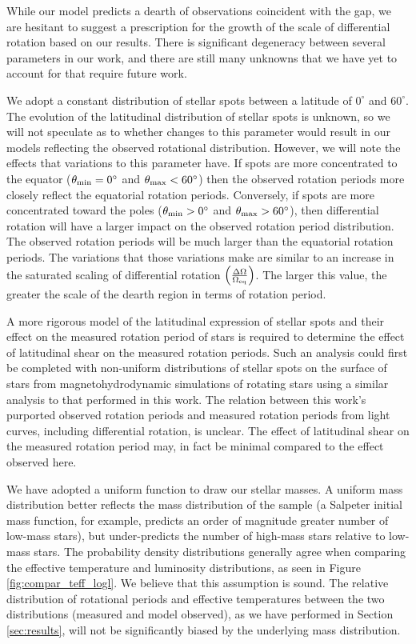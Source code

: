 While our model predicts a dearth of observations coincident with the gap, we are hesitant to suggest a prescription for the growth of the scale of differential rotation based on our results.
There is significant degeneracy between several parameters in our work, and there are still many unknowns that we have yet to account for that require future work.

We adopt a constant distribution of stellar spots between a latitude of $0^{\circ}$ and $60^{\circ}$.
The evolution of the latitudinal distribution of stellar spots is unknown, so we will not speculate as to whether changes to this parameter would result in our models reflecting the observed rotational distribution.
However, we will note the effects that variations to this parameter have.
If spots are more concentrated to the equator ($\theta_{\rm{min}} = 0^{\circ}$ and $\theta_{\rm{max}} < 60^{\circ}$) then the observed rotation periods more closely reflect the equatorial rotation periods.
Conversely, if spots are more concentrated toward the poles ($\theta_{\rm{min}} > 0^{\circ}$ and $\theta_{\rm{max}} > 60^{\circ}$), then differential rotation will have a larger impact on the observed rotation period distribution.
The observed rotation periods will be much larger than the equatorial rotation periods.
The variations that those variations make are similar to an increase in the saturated scaling of differential rotation $\left(\frac{\Delta\Omega}{\Omega_{\rm{eq}}}\right)$.
The larger this value, the greater the scale of the dearth region in terms of rotation period.

A more rigorous model of the latitudinal expression of stellar spots and their effect on the measured rotation period of stars is required to determine the effect of latitudinal shear on the measured rotation periods.
Such an analysis could first be completed with non-uniform distributions of stellar spots on the surface of stars from magnetohydrodynamic simulations of rotating stars using a similar analysis to that performed in this work. 
The relation between this work's purported observed rotation periods and measured rotation periods from light curves, including differential rotation, is unclear.
The effect of latitudinal shear on the measured rotation period may, in fact be minimal compared to the effect observed here.

We have adopted a uniform function to draw our stellar masses.
A uniform mass distribution better reflects the mass distribution of the \citet{mcquillan_rotation_2014} sample (a Salpeter initial mass function, for example, predicts an order of magnitude greater number of low-mass stars), but under-predicts the number of high-mass stars relative to low-mass stars.
The probability density distributions generally agree when comparing the effective temperature and luminosity distributions, as seen in Figure \ref{fig:compar_teff_logl}.
We believe that this assumption is sound.
The relative distribution of rotational periods and effective temperatures between the two distributions (measured and model observed), as we have performed in Section \ref{sec:results}, will not be significantly biased by the underlying mass distribution.


